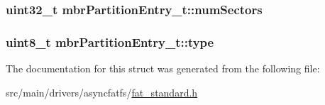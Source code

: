 \hypertarget{structmbrPartitionEntry__t_af1bb8af8304f618b57809d5c33a5c898}{
\subsubsection[{num\+Sectors}]{\setlength{\rightskip}{0pt plus 5cm}uint32\+\_\+t mbr\+Partition\+Entry\+\_\+t\+::num\+Sectors}}\label{structmbrPartitionEntry__t_af1bb8af8304f618b57809d5c33a5c898}
\hypertarget{structmbrPartitionEntry__t_ab8abbfc312acb6e6fdf4e0b0bcd926d2}{
\subsubsection[{type}]{\setlength{\rightskip}{0pt plus 5cm}uint8\+\_\+t mbr\+Partition\+Entry\+\_\+t\+::type}}\label{structmbrPartitionEntry__t_ab8abbfc312acb6e6fdf4e0b0bcd926d2}


The documentation for this struct was generated from the following file\+:\begin{DoxyCompactItemize}
\item 
src/main/drivers/asyncfatfs/\hyperlink{fat__standard_8h}{fat\+\_\+standard.\+h}\end{DoxyCompactItemize}
